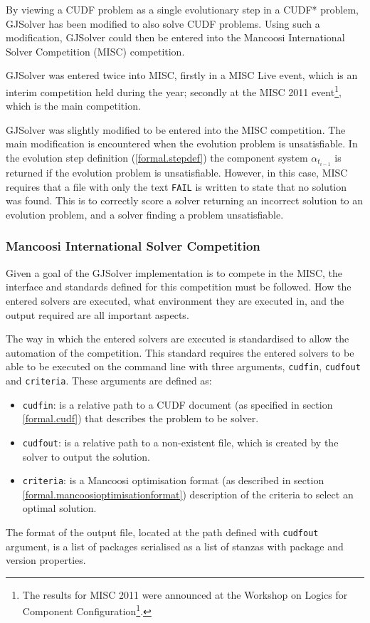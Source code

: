By viewing a CUDF problem as a single evolutionary step in a CUDF* problem, GJSolver has been modified to also solve CUDF problems.
Using such a modification, GJSolver could then be entered into the Mancoosi International Solver Competition (MISC) competition.

GJSolver was entered twice into MISC, firstly in a MISC Live event, which is an interim competition held during the year;
secondly at the MISC 2011 event\footnote{The results for MISC 2011 were announced at the Workshop on Logics for Component Configuration\footnote{http://www.pps.jussieu.fr/~treinen/lococo/2011/ accessed 6/3/2012}.}, 
which is the main competition. 

GJSolver was slightly modified to be entered into the MISC competition.
The main modification is encountered when the evolution problem is unsatisfiable.
In the evolution step definition (\ref{formal.stepdef}) the component system $\alpha_{t_{i-1}}$ is returned if the evolution problem is unsatisfiable.
However, in this case, MISC requires that a file with only the text \texttt{FAIL} is written to state that no solution was found.
This is to correctly score a solver returning an incorrect solution to an evolution problem, 
and a solver finding a problem unsatisfiable.

\subsubsection{Mancoosi International Solver Competition}
\label{impl.MISCDEF}
Given a goal of the GJSolver implementation is to compete in the MISC, the interface and standards defined for this competition must be followed.
How the entered solvers are executed, what environment they are executed in, and the output required are all important aspects.

The way in which the entered solvers are executed is standardised to allow the automation of the competition.
This standard requires the entered solvers to be able to be executed on the command line with three arguments, \verb+cudfin+, \verb+cudfout+ and \verb+criteria+.
These arguments are defined as:
\begin{itemize}
  \item \verb+cudfin+: is a relative path to a CUDF document (as specified in section \ref{formal.cudf}) that describes the problem to be solver.
  \item \verb+cudfout+: is a relative path to a non-existent file, which is created by the solver to output the solution.
  \item \verb+criteria+: is a Mancoosi optimisation format (as described in section \ref{formal.mancoosioptimisationformat}) description of the criteria to select an optimal solution. 
\end{itemize}
The format of the output file, located at the path defined with \verb+cudfout+ argument, is a list of packages serialised as a list of stanzas with package and version properties.


